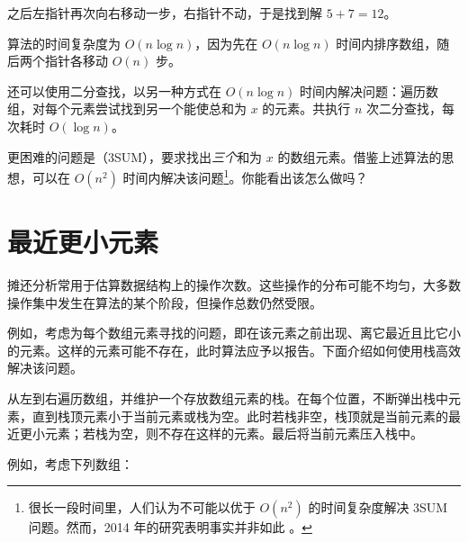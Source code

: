 之后左指针再次向右移动一步，右指针不动，于是找到解 $5+7=12$。

\begin{center}
\end{center}

算法的时间复杂度为 $O(n\log n)$，因为先在 $O(n\log n)$ 时间内排序数组，随后两个指针各移动 $O(n)$ 步。

还可以使用二分查找，以另一种方式在 $O(n\log n)$ 时间内解决问题：遍历数组，对每个元素尝试找到另一个能使总和为 $x$ 的元素。共执行 $n$ 次二分查找，每次耗时 $O(\log n)$。

更困难的问题是（3SUM），要求找出\emph{三个}和为 $x$ 的数组元素。借鉴上述算法的思想，可以在 $O(n^2)$ 时间内解决该问题\footnote{很长一段时间里，人们认为不可能以优于 $O(n^2)$ 的时间复杂度解决 3SUM 问题。然而，2014 年的研究表明事实并非如此 \cite{gro14}。}。你能看出该怎么做吗？

\section{最近更小元素}


摊还分析常用于估算数据结构上的操作次数。这些操作的分布可能不均匀，大多数操作集中发生在算法的某个阶段，但操作总数仍然受限。

例如，考虑为每个数组元素寻找的问题，即在该元素之前出现、离它最近且比它小的元素。这样的元素可能不存在，此时算法应予以报告。下面介绍如何使用栈高效解决该问题。

从左到右遍历数组，并维护一个存放数组元素的栈。在每个位置，不断弹出栈中元素，直到栈顶元素小于当前元素或栈为空。此时若栈非空，栈顶就是当前元素的最近更小元素；若栈为空，则不存在这样的元素。最后将当前元素压入栈中。

例如，考虑下列数组：
\begin{center}
\end{center}

